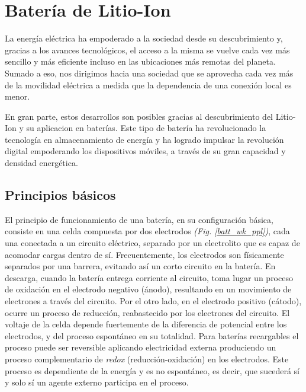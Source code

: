 
\section{Batería de Litio-Ion}

La energía eléctrica ha empoderado a la sociedad desde su descubrimiento y,
gracias a los avances tecnológicos, el acceso a la misma se vuelve cada vez más
sencillo y más eficiente incluso en las ubicaciones más remotas del planeta.
Sumado a eso, nos dirigimos hacia una sociedad que se aprovecha cada vez más de la
movilidad eléctrica a medida que la dependencia de una conexi\'on local es
menor.

En gran parte, estos desarrollos son posibles gracias al descubrimiento del
Litio-Ion y su aplicacion en baterías. Este tipo de batería ha revolucionado la
tecnolog\'ia en almacenamiento de energ\'ia y ha logrado impulsar la
revoluci\'on digital empoderando los dispositivos móviles, a trav\'es de su gran
capacidad y densidad energ\'etica.

\subsection{Principios b\'asicos}

El principio de funcionamiento de una batería, en su configuraci\'on
b\'asica, consiste en una celda compuesta por dos electrodos 
\emph{(Fig. \ref{batt_wk_ppl})}, cada una conectada a un circuito el\'ectrico, 
separado por un electrolito que es capaz de acomodar cargas dentro de sí. 
Frecuentemente, los electrodos son f\'isicamente separados por una barrera, 
evitando así un corto circuito en la batería. En descarga, cuando la bater\'ia 
entrega corriente al circuito, toma lugar un proceso de oxidación en el electrodo 
negativo (\'anodo), resultando en un movimiento de electrones a trav\'es del 
circuito. Por el otro lado, en el electrodo positivo (c\'atodo), ocurre un 
proceso de reducción, reabastecido por los electrones del circuito. El voltaje 
de la celda depende fuertemente de la diferencia de potencial entre los 
electrodos, y del proceso espont\'aneo en su totalidad. Para baterías 
recargables el proceso puede ser reversible aplicando electricidad externa 
produciendo un proceso complementario de \emph{redox} (reducci\'on-oxidaci\'on) 
en los electrodos. Este proceso es dependiente de la energ\'ia y es no 
espont\'aneo, es decir, que sucederá s\'i y solo s\'i un agente externo 
participa en el proceso.

